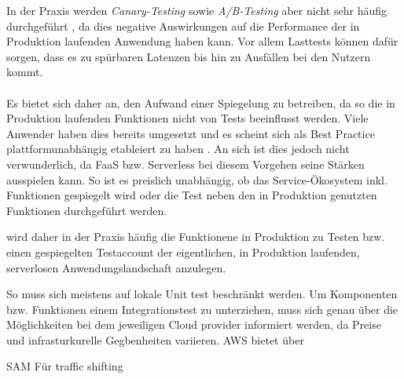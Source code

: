 \documentclass[11pt]{article}
\begin{document}
In der Praxis werden \textit{Canary-Testing} sowie \textit{A/B-Testing} aber nicht sehr häufig durchgeführt \cite{leitner2019mixed}, da dies negative Auswirkungen auf die Performance der in Produktion laufenden Anwendung haben kann. Vor allem Lasttests können dafür sorgen, dass es zu spürbaren Latenzen bis hin zu Ausfällen bei den Nutzern kommt. \\\\
Es bietet sich daher an, den Aufwand einer Spiegelung zu betreiben, da so die in Produktion laufenden Funktionen nicht von Tests beeinflusst werden. Viele Anwender haben dies bereits umgesetzt und es scheint sich als \glqq Best Practice\grqq{} plattformunabhängig etableiert zu haben \cite{leitner2019mixed}. An sich ist dies jedoch nicht verwunderlich, da FaaS bzw. Serverless bei diesem Vorgehen seine Stärken ausspielen kann. So ist es preislich unabhängig, ob das Service-Ökosystem inkl. Funktionen gespiegelt wird oder die Test neben den in Produktion genutzten Funktionen durchgeführt werden.   

wird daher in der Praxis häufig die Funktionene in Produktion zu Testen bzw. einen gespiegelten Testaccount der eigentlichen, in Produktion laufenden, serverlosen Anwendungslandschaft anzulegen.  




So muss sich meistens auf lokale Unit test beschränkt werden. Um Komponenten bzw. Funktionen einem Integrationstest zu unterziehen, muss sich genau über die Möglichkeiten bei dem jeweiligen Cloud provider informiert werden, da Preise und infrasturkurelle Gegbenheiten variieren. AWS bietet über 

SAM Für traffic shifting
	

\end{document}
